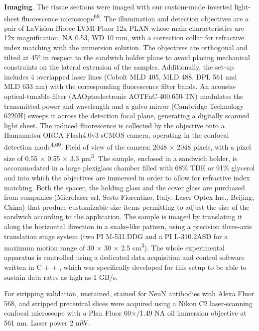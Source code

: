 \documentclass{article}
\begin{document}
\textbf{Imaging}. The tissue sections were imaged with our custom-made inverted light-sheet fluorescence microscope\textsuperscript{68}. The illumination and detection objectives are a pair of LaVision Biotec LVMI-Fluor 12x PLAN whose main characteristics are 12x magnification, NA 0.53, WD 10 mm, with a correction collar for refractive index matching with the immersion solution. The objectives are orthogonal and tilted at 45° in respect to the sandwich holder plane to avoid placing mechanical constraints on the lateral extension of the samples. Additionally, the set-up includes 4 overlapped laser lines (Cobolt MLD 405, MLD 488, DPL 561 and MLD 633 nm) with the corresponding fluorescence filter bands. An acousto-optical-tunable-filter (AAOptoelectronic AOTFnC-400.650-TN) modulates the transmitted power and wavelength and a galvo mirror (Cambridge Technology 6220H) sweeps it across the detection focal plane, generating a digitally scanned light sheet. The induced fluorescence is collected by the objective onto a Hamamatsu ORCA Flash4.0v3 sCMOS camera, operating in the confocal detection mode\textsuperscript{4,69}. Field of view of the camera: 2048 × 2048 pixels, with a pixel size of 0.55 × 0.55 × 3.3 µm\textsuperscript{3}. The sample, enclosed in a sandwich holder, is accommodated in a large plexiglass chamber filled with 68\% TDE or 91\% glycerol and into which the objectives are immersed in order to allow for refractive index matching. Both the spacer, the holding glass and the cover glass are purchased from companies (Microlaser srl, Sesto Fiorentino, Italy; Laser Optex Inc., Beijing, China) that produce customizable size items permitting to adjust the size of the sandwich according to the application. The sample is imaged by translating it along the horizontal direction in a snake-like pattern, using a precision three-axis translation stage system (two PI M-531.DDG and a PI L-310.2ASD for a maximum motion range of 30 × 30 × 2.5 cm\textsuperscript{3}). The whole experimental apparatus is controlled using a dedicated data acquisition and control software written in C + + , which was specifically developed for this setup to be able to sustain data rates as high as 1 GB/s.

For stripping validation, unstained, stained for NeuN antibodies with Alexa Fluor 568, and stripped precentral slices were acquired using a Nikon C2 laser-scanning confocal microscope with a Plan Fluor 60×/1.49 NA oil immersion objective at 561 nm. Laser power 2 mW.
\end{document}
